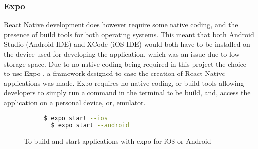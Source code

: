 \subsubsection{Expo}
React Native development does however require some native coding, and the presence of build tools for both operating systems. This meant that both Android Studio (Android IDE) and XCode (iOS IDE) would both have to be installed on the device used for developing the application, which was an issue due to low storage space. Due to no native coding being required in this project the choice to use Expo \cite{expo}, a framework designed to ease the creation of React Native applications was made. Expo requires no native coding, or build tools allowing developers to simply run a command in the terminal to be build, and, access the application on a personal device, or, emulator.
\begin{figure}[!htbp]
\centering
\begin{subfigure}[b]{0.5\textwidth}
\begin{lstlisting}[language=bash]
  $ expo start --ios
  $ expo start --android
\end{lstlisting}
\end{subfigure}
\caption{To build and start applications with expo for iOS or Android}
\end{figure}
